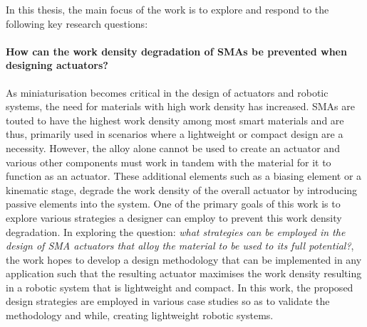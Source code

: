 In this thesis, the main focus of the work is to explore and respond to the following key research questions:

\paragraph{How can the work density degradation of SMAs be prevented when designing actuators?}
As miniaturisation becomes critical in the design of actuators and robotic systems, the need for materials with high work density has increased. SMAs are touted to have the highest work density among most smart materials and are thus, primarily used in scenarios where a lightweight or compact design are a necessity. However, the alloy alone cannot be used to create an actuator and various other components must work in tandem with the material for it to function as an actuator. These additional elements such as a biasing element or a kinematic stage, degrade the work density of the overall actuator by introducing passive elements into the system. One of the primary goals of this work is to explore various strategies a designer can employ to prevent this work density degradation. In exploring the question: \textit{what strategies can be employed in the design of SMA actuators that alloy the material to be used to its full potential?}, the work hopes to develop a design methodology that can be implemented in any application such that the resulting actuator maximises the work density resulting in a robotic system that is lightweight and compact. In this work, the proposed design strategies are employed in various case studies so as to validate the methodology and while, creating lightweight robotic systems.

